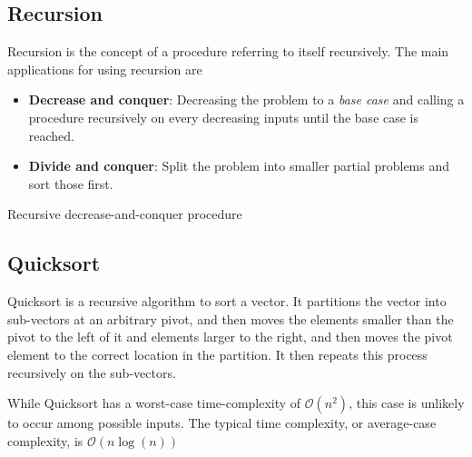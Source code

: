 \subsection{Recursion}
Recursion is the concept of a procedure referring to itself recursively. The main applications for using recursion are
\begin{itemize}
	\item \textbf{Decrease and conquer}: Decreasing the problem to a \emph{base case} and calling a procedure recursively on every decreasing inputs until the base case is reached. 
	\item \textbf{Divide and conquer}: Split the problem into smaller partial problems and sort those first. 
\end{itemize}

\begin{algorithm}[H]
	\caption{Recursive decrease-and-conquer procedure}\label{alg:fact}
	\begin{algorithmic}
		\EndIf{}

		\EndFunction{}
	\end{algorithmic}
\end{algorithm}

\subsection{Quicksort}
Quicksort is a recursive algorithm to sort a vector. It partitions the vector into sub-vectors at an arbitrary pivot, and then moves the elements smaller than the pivot to the left of it and elements larger to the right, and then moves the pivot element to the correct location in the partition. It then repeats this process recursively on the sub-vectors.

While Quicksort has a worst-case time-complexity of \( \mathcal{O}(n^2) \), this case is unlikely to occur among possible inputs. The typical time complexity, or average-case complexity, is \( \mathcal{O}(n \log(n)) \)

